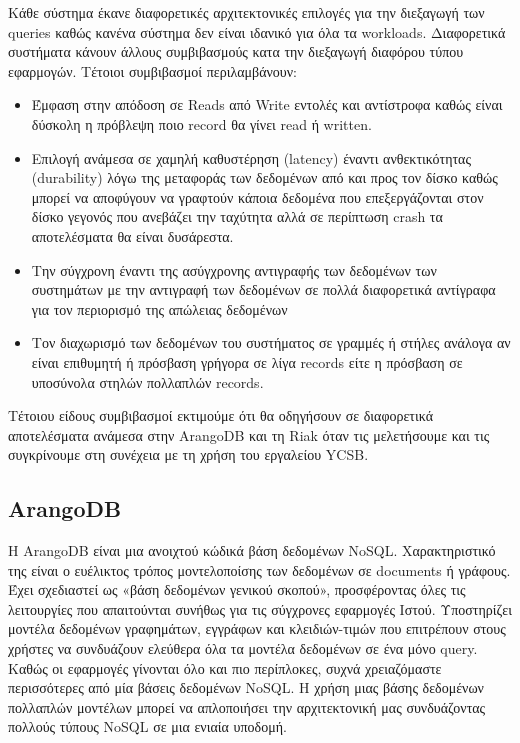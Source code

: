 \documentclass[conference]{IEEEtran}
\begin{document}
        Κάθε σύστημα έκανε διαφορετικές αρχιτεκτονικές επιλογές για την διεξαγωγή των queries καθώς κανένα σύστημα δεν είναι ιδανικό για όλα τα workloads. Διαφορετικά συστήματα κάνουν άλλους συμβιβασμούς κατα την διεξαγωγή διαφόρου τύπου εφαρμογών. Τέτοιοι συμβιβασμοί περιλαμβάνουν: 
        \begin{itemize}
        \item
        Έμφαση στην απόδοση σε Reads από Write εντολές και αντίστροφα καθώς είναι δύσκολη η πρόβλεψη ποιο record θα γίνει read ή written.
        \item
        Επιλογή ανάμεσα σε χαμηλή καθυστέρηση (latency) έναντι ανθεκτικότητας (durability) λόγω της μεταφοράς των δεδομένων από και προς τον δίσκο καθώς μπορεί να αποφύγουν να γραφτούν κάποια δεδομένα που επεξεργάζονται στον δίσκο γεγονός που ανεβάζει την ταχύτητα αλλά σε περίπτωση crash τα αποτελέσματα θα είναι δυσάρεστα.
        \item
        Την σύγχρονη έναντι της ασύγχρονης αντιγραφής των δεδομένων των συστημάτων με την αντιγραφή των δεδομένων σε πολλά διαφορετικά αντίγραφα για τον περιορισμό της απώλειας δεδομένων
        \item
        Τον διαχωρισμό των δεδομένων του συστήματος σε γραμμές ή στήλες ανάλογα αν είναι επιθυμητή ή πρόσβαση γρήγορα σε λίγα records είτε η πρόσβαση σε υποσύνολα στηλών πολλαπλών records.
    \end{itemize}

Τέτοιου είδους συμβιβασμοί εκτιμούμε ότι θα οδηγήσουν σε διαφορετικά αποτελέσματα ανάμεσα στην ArangoDB και τη Riak όταν τις μελετήσουμε και τις συγκρίνουμε στη συνέχεια με τη χρήση του εργαλείου YCSB.

\subsection{ArangoDB}
Η ArangoDB είναι μια ανοιχτού κώδικά βάση δεδομένων NoSQL. Χαρακτηριστικό της είναι ο ευέλικτος τρόπος μοντελοποίσης των δεδομένων σε documents ή γράφους. Έχει σχεδιαστεί ως «βάση δεδομένων γενικού σκοπού», προσφέροντας όλες τις λειτουργίες που απαιτούνται συνήθως για τις σύγχρονες εφαρμογές Ιστού. Υποστηρίζει μοντέλα δεδομένων γραφημάτων, εγγράφων και κλειδιών-τιμών που επιτρέπουν στους χρήστες να συνδυάζουν ελεύθερα όλα τα μοντέλα δεδομένων σε ένα μόνο query. Καθώς οι εφαρμογές γίνονται όλο και πιο περίπλοκες, συχνά χρειαζόμαστε περισσότερες από μία βάσεις δεδομένων NoSQL. Η χρήση μιας βάσης δεδομένων πολλαπλών μοντέλων μπορεί να απλοποιήσει την αρχιτεκτονική μας συνδυάζοντας πολλούς τύπους NoSQL σε μια ενιαία υποδομή.
\end{document}
